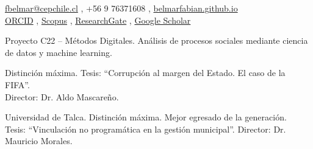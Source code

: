 \documentclass[10pt,letterpaper]{article}
\begin{document}

\begin{center}
\href{mailto:fbelmar@cepchile.cl}{fbelmar@cepchile.cl} \sep
+56 9 76371608 \sep
\href{https://belmarfabian.github.io}{belmarfabian.github.io}\\[3pt]
{\footnotesize
\href{https://orcid.org/0000-0003-4239-1874}{ORCID} \sep
\href{https://www.scopus.com/authid/detail.uri?authorId=57220090371}{Scopus} \sep
\href{https://www.researchgate.net/profile/Fabian-Belmar-3}{ResearchGate} \sep
\href{https://scholar.google.es/citations?user=wr6beBsAAAAJ}{Google Scholar}
}
\end{center}

\vspace{6pt}


\hspace{2.5em}Proyecto C22 -- Métodos Digitales. Análisis de procesos sociales mediante ciencia de datos y machine learning.


\hspace{2.5em}Distinción máxima. Tesis: ``Corrupción al margen del Estado. El caso de la FIFA''.\\
\hspace{2.5em}Director: Dr. Aldo Mascareño.

\vspace{4pt}

\hspace{2.5em}Universidad de Talca. Distinción máxima. Mejor egresado de la generación.\\
\hspace{2.5em}Tesis: ``Vinculación no programática en la gestión municipal''. Director: Dr. Mauricio Morales.

\end{document}
